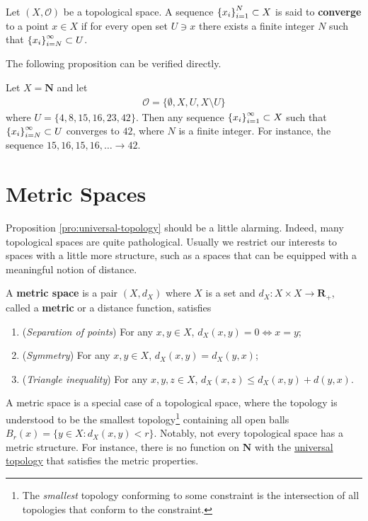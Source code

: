 \begin{definition}[Convergence]\label{def:convergence}
  Let $(X,\mathcal{O})$ be a topological space. A sequence
  $\indexedint{i}{N}{x}\subset X$ is said to \textbf{converge} to a
  point $x\in X$ if for every open set $U\ni x$ there exists a finite
  integer $N$ such that $\indexedint[N]{i}{\infty}{x}\subset U$.
\end{definition}

The following proposition can be verified directly.

\begin{proposition}
  \label{pro:universal-topology}
  Let $X = \mathbf{N}$ and let
  \begin{align*}
    \mathcal{O} = \{\emptyset, X, U, X\setminus U\}
  \end{align*}
  where $U = \{4,8,15,16,23,42\}$. Then any sequence
  $\indexedint{i}{\infty}{x}\subset X$ such that
  $\indexedint[N]{i}{\infty}{x}\subset U$ converges to $42$, where $N$
  is a finite integer. For instance, the sequence $15, 16, 15, 16,
  \dots\to 42$.
\end{proposition}

\section{Metric Spaces}\label{s:metric-space}
Proposition \ref{pro:universal-topology} should be a little
alarming. Indeed, many topological spaces are quite
pathological. Usually we restrict our interests to spaces with a
little more structure, such as a spaces that can be equipped with a
meaningful notion of distance.

\begin{definition}\label{def:metric-space}
  A \textbf{metric space} is a pair $(X, d_X)$ where $X$ is a set and
  $d_X:X\times X\to\mathbf{R}_+$, called a \textbf{metric} or a
  distance function, satisfies
  \begin{enumerate}
  \item (\emph{Separation of points}) For any $x,y\in X$, $d_X(x, y) = 0\iff
    x = y$;
  \item (\emph{Symmetry}) For any $x,y\in X$, $d_X(x, y) = d_X(y, x)$;
  \item (\emph{Triangle inequality}) For any $x,y,z\in X$, $d_X(x,
    z)\leq d_X(x, y) + d(y, x)$.
  \end{enumerate}
\end{definition}

A metric space is a special case of a topological space, where the
topology is understood to be the smallest topology\footnote{The
  \emph{smallest} topology conforming to some constraint is the
  intersection of all topologies that conform to the constraint.} containing all open
balls $B_r(x) = \{y\in X : d_X(x, y)<r\}$. Notably, not every
topological space has a metric structure. For instance, there is no
function on $\mathbf{N}$ with the
\hyperref[pro:universal-topology]{universal topology} that satisfies
the metric properties.

